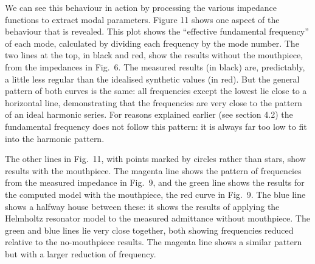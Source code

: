 
  We can see this behaviour in action by processing the various impedance 
  functions to extract modal parameters. Figure 11 shows one aspect of the 
  behaviour that is revealed. This plot shows the “effective fundamental 
  frequency” of each mode, calculated by dividing each frequency by the mode 
  number. The two lines at the top, in black and red, show the results without 
  the mouthpiece, from the impedances in Fig.\ 6. The measured results (in 
  black) are, predictably, a little less regular than the idealised synthetic 
  values (in red). But the general pattern of both curves is the same: all 
  frequencies except the lowest lie close to a horizontal line, demonstrating 
  that the frequencies are very close to the pattern of an ideal harmonic 
  series. For reasons explained earlier (see section 4.2) the fundamental 
  frequency does not follow this pattern: it is always far too low to fit into 
  the harmonic pattern. 


  The other lines in Fig.\ 11, with points marked by circles rather than stars, 
  show results with the mouthpiece. The magenta line shows the pattern of 
  frequencies from the measured impedance in Fig.\ 9, and the green line shows 
  the results for the computed model with the mouthpiece, the red curve in 
  Fig.\ 9. The blue line shows a halfway house between these: it shows the 
  results of applying the Helmholtz resonator model to the measured admittance 
  without mouthpiece. The green and blue lines lie very close together, both 
  showing frequencies reduced relative to the no-mouthpiece results. The 
  magenta line shows a similar pattern but with a larger reduction of 
  frequency. 

